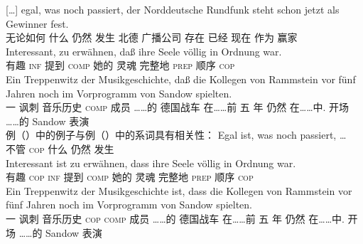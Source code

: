 {}[\ldots]
\gll egal,      was  noch  passiert, der Norddeutsche Rundfunk             steht  schon   jetzt als Gewinner fest.\footnotemark\\
     无论如何 什么 仍然 发生  北德 广播公司 存在 已经 现在 作为 赢家 \particle\\
\ex 
\gll Interessant, zu erwähnen, daß ihre Seele völlig    in Ordnung war.\footnotemark\\
	 有趣 \textsc{inf} 提到 \textsc{comp} 她的 灵魂 完整地 \textsc{prep} 顺序 \textsc{cop}\\
\ex
\gll Ein Treppenwitz der    Musikgeschichte, daß die Kollegen   von Rammstein vor    fünf Jahren noch im      Vorprogramm   von Sandow spielten.\footnotemark\\
	 一 讽刺  音乐历史 \textsc{comp}  成员 ……的 德国战车 在……前 五 年 仍然 在……中. 开场 ……的 Sandow 表演\\
\zl
例（）中的例子与例（）中的系词具有相关性：
\eal
\ex 
\gll Egal ist, was noch passiert, \ldots\\
     不管 \textsc{cop}	 什么 仍然 发生 \\
\ex
\gll Interessant ist zu erwähnen, dass ihre Seele völlig in Ordnung war.\\
	 有趣 \textsc{cop} \textsc{inf} 提到 \textsc{comp} 她的 灵魂 完整地 \textsc{prep} 顺序 \textsc{cop}\\
\ex %
\gll Ein Treppenwitz der Musikgeschichte ist, dass die Kollegen von Rammstein vor fünf Jahren noch im Vorprogramm von Sandow spielten.\hspace{-5pt}\\
	 一 讽刺  音乐历史 \textsc{cop} \textsc{comp}  成员 ……的 德国战车 在……前 五 年 仍然 在……中. 开场 ……的 Sandow 表演\\
\zl


